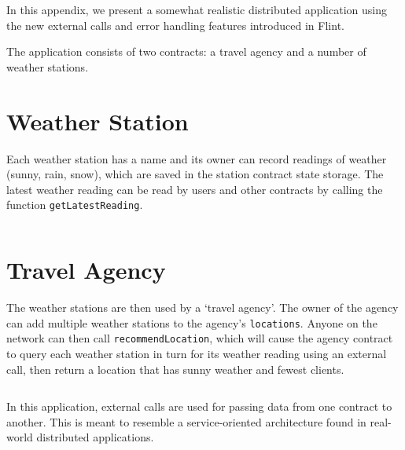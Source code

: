 In this appendix, we present a somewhat realistic distributed application using the new external calls and error handling features introduced in Flint.

The application consists of two contracts: a travel agency and a number of weather stations.

\section{Weather Station}

Each weather station has a name and its owner can record readings of weather (sunny, rain, snow), which are saved in the station contract state storage. The latest weather reading can be read by users and other contracts by calling the function \texttt{getLatestReading}.

\inputminted{swift}{code/appendix-c-station.flint}

\section{Travel Agency}

The weather stations are then used by a `travel agency'. The owner of the agency can add multiple weather stations to the agency's \texttt{locations}. Anyone on the network can then call \texttt{recommendLocation}, which will cause the agency contract to query each weather station in turn for its weather reading using an external call, then return a location that has sunny weather and fewest clients.

\inputminted{swift}{code/appendix-c-agency.flint}

In this application, external calls are used for passing data from one contract to another. This is meant to resemble a service-oriented architecture found in real-world distributed applications.
